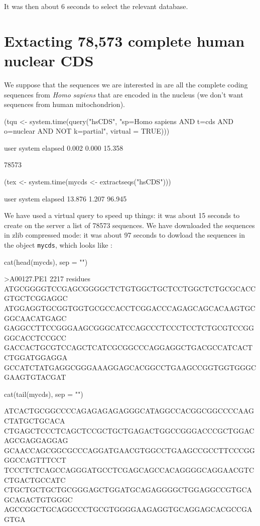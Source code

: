 \documentclass{article}
\begin{document}
It was then about 6 
seconds to select the relevant database.

\section{Extacting 78,573 complete human nuclear CDS}

We suppose that the sequences we are interested in 
are all the complete coding sequences from \textit{Homo sapiens} that
are encoded in the nucleus (we don't want sequences from human mitochondrion). 

\begin{Schunk}
\begin{Sinput}
 (tqu <- system.time(query("hsCDS", "sp=Homo sapiens AND t=cds AND o=nuclear AND NOT k=partial", 
     virtual = TRUE)))
\end{Sinput}
\begin{Soutput}
   user  system elapsed 
  0.002   0.000  15.358 
\end{Soutput}
\begin{Soutput}
[1] 78573
\end{Soutput}
\begin{Sinput}
 (tex <- system.time(mycds <- extractseqs("hsCDS")))
\end{Sinput}
\begin{Soutput}
   user  system elapsed 
 13.876   1.207  96.945 
\end{Soutput}
\end{Schunk}
 
We have used a virtual query to speed up things:
it was about 15 seconds 
to create on the server a list of 78573
sequences. We have downloaded the sequences in zlib compressed mode:
it was about 97 seconds
to dowload the sequences in the object \texttt{mycds}, which looks like :

\begin{Schunk}
\begin{Sinput}
 cat(head(mycds), sep = "\n")
\end{Sinput}
\begin{Soutput}
>A00127.PE1             2217 residues
ATGCGGGGTCCGAGCGGGGCTCTGTGGCTGCTCCTGGCTCTGCGCACCGTGCTCGGAGGC
ATGGAGGTGCGGTGGTGCGCCACCTCGGACCCAGAGCAGCACAAGTGCGGCAACATGAGC
GAGGCCTTCCGGGAAGCGGGCATCCAGCCCTCCCTCCTCTGCGTCCGGGGCACCTCCGCC
GACCACTGCGTCCAGCTCATCGCGGCCCAGGAGGCTGACGCCATCACTCTGGATGGAGGA
GCCATCTATGAGGCGGGAAAGGAGCACGGCCTGAAGCCGGTGGTGGGCGAAGTGTACGAT
\end{Soutput}
\begin{Sinput}
 cat(tail(mycds), sep = "\n")
\end{Sinput}
\begin{Soutput}
ATCACTGCGGCCCCAGAGAGAGAGGGCATAGGCCACGGCGGCCCCAAGCTATGCTGCACA
CTGAGCTCCCTCAGCTCCGCTGCTGAGACTGGCCGGGACCCGCTGGACAGCGAGGAGGAG
GCAACCAGCGGCGCCCAGGATGAACGTGGCCTGAAGCCGCCTTCCCGGGGCCAGTTTCCT
TCCCTCTCAGCCAGGGATGCCTCGAGCAGCCACAGGGGCAGGAACGTCCTGACTGCCATC
CTGCTGCTGCTGCGGGAGCTGGATGCAGAGGGGCTGGAGGCCGTGCAGCAGACTGTGGGC
AGCCGGCTGCAGGCCCTGCGTGGGGAAGAGGTGCAGGAGCACGCCGAGTGA
\end{Soutput}
\end{Schunk}
\end{document}

